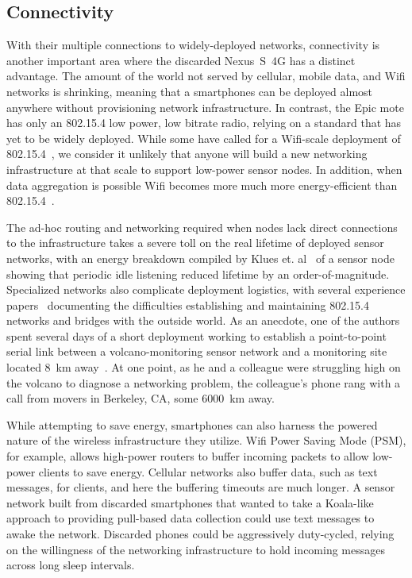 \subsection{Connectivity}

With their multiple connections to widely-deployed networks, connectivity is
another important area where the discarded Nexus~S~4G has a distinct
advantage. The amount of the world not served by cellular, mobile data, and
Wifi networks is shrinking, meaning that a smartphones can be deployed almost
anywhere without provisioning network infrastructure. In contrast, the Epic
mote has only an 802.15.4 low power, low bitrate radio, relying on a standard
that has yet to be widely deployed. While some have called for a Wifi-scale
deployment of 802.15.4~\cite{leaves-ipsn12}, we consider it unlikely that
anyone will build a new networking infrastructure at that scale to support
low-power sensor nodes. In addition, when data aggregation is possible Wifi
becomes more much more energy-efficient than
802.15.4~\cite{wirelessenergyconsumption-url}.

The ad-hoc routing and networking required when nodes lack direct connections
to the infrastructure takes a severe toll on the real lifetime of deployed
sensor networks, with an energy breakdown compiled by Klues et.
al~\cite{icem-sosp07} of a sensor node showing that periodic idle listening
reduced lifetime by an order-of-magnitude. Specialized networks also
complicate deployment logistics, with several experience
papers~\cite{volcano-osdi06,hitchhikers-sensys08} documenting the
difficulties establishing and maintaining 802.15.4 networks and bridges with
the outside world. As an anecdote, one of the authors spent several days of a
short deployment working to establish a point-to-point serial link between a
volcano-monitoring sensor network and a monitoring site located 8~km
away~\cite{lance-sensys08}. At one point, as he and a colleague were
struggling high on the volcano to diagnose a networking problem, the
colleague's phone rang with a call from movers in Berkeley, CA, some
\num{6000}~km away.

While attempting to save energy, smartphones can also harness the powered
nature of the wireless infrastructure they utilize. Wifi Power Saving Mode
(PSM), for example, allows high-power routers to buffer incoming packets to
allow low-power clients to save energy. Cellular networks also buffer data,
such as text messages, for clients, and here the buffering timeouts are much
longer. A sensor network built from discarded smartphones that wanted to take
a Koala-like~\cite{koala-ipsn08} approach to providing pull-based data
collection could use text messages to awake the network. Discarded phones
could be aggressively duty-cycled, relying on the willingness of the
networking infrastructure to hold incoming messages across long sleep
intervals.

